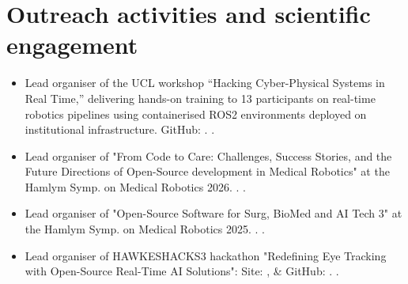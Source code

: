 \documentclass{mycv}
\begin{document}
\section{Outreach activities and scientific engagement}
\begin{itemize}

\item
	Lead organiser of the UCL workshop “Hacking Cyber-Physical Systems in Real Time,”
	delivering hands-on training to 13 participants on real-time robotics pipelines using containerised ROS2 environments
	deployed on institutional infrastructure.
	GitHub: \href{https://github.com/UCL-CyberPhysicalSystems/hackathon-01}{\faGithub*}.
	.

\item Lead organiser of "From Code to Care: Challenges, Success Stories, and the Future Directions of Open-Source development in Medical Robotics" at the Hamlym Symp. on Medical Robotics 2026.
	\href{https://www.hamlynsymposium.org/events/from-code-to-care-challenges-success-stories-and-the-future-directions-of-open-source-development-in-medical-robotics/}{\faExternalLink*}.
	.

\item Lead organiser of "Open-Source Software for Surg, BioMed and AI Tech 3" at the Hamlym Symp. on Medical Robotics 2025.
	\href{https://www.hamlynsymposium.org/events/healing-through-collaboration-open-source-software-in-surgical-biomedical-and-ai-technologies/}{\faExternalLink*}.
	.

\item Lead organiser of HAWKESHACKS3 hackathon "Redefining Eye Tracking with Open-Source Real-Time AI Solutions":
	Site: \href{https://cmic-ucl.github.io/CMICHACKS/}{\faExternalLink*}, \&
	GitHub: \href{https://github.com/oocular/ready/tree/main/docs/hackathons/hawkes2024}{\faGithub*}.
	.


\end{itemize}
\end{document}
